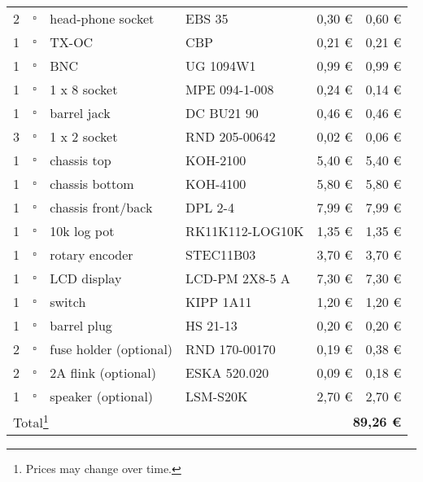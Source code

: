 \begin{longtable}{|p{}|p{}|p{}|p{}|p{}|p{}|}
2 & $\square$ & head-phone socket & EBS 35 & 0,30 \euro & 0,60 \euro\\
1 & $\square$ & TX-OC & CBP & 0,21 \euro & 0,21 \euro \\
1 & $\square$ & BNC & UG 1094W1 & 0,99 \euro & 0,99 \euro \\
1 & $\square$ & 1 x 8 socket & MPE 094-1-008 & 0,24 \euro & 0,14 \euro \\
1 & $\square$ & barrel jack & DC BU21 90 & 0,46 \euro & 0,46 \euro \\
3 & $\square$ & 1 x 2 socket & RND 205-00642 & 0,02 \euro & 0,06 \euro \\ \hline
1 & $\square$ & chassis top & KOH-2100 & 5,40 \euro & 5,40 \euro \\
1 & $\square$ & chassis bottom & KOH-4100 & 5,80 \euro & 5,80 \euro \\
1 & $\square$ & chassis front/back & DPL 2-4 & 7,99 \euro & 7,99 \euro \\
1 & $\square$ & 10k log pot & RK11K112-LOG10K & 1,35 \euro & 1,35 \euro \\
1 & $\square$ & rotary encoder & STEC11B03 & 3,70 \euro & 3,70 \euro \\
1 & $\square$ & LCD display & LCD-PM 2X8-5 A & 7,30 \euro & 7,30 \euro \\
1 & $\square$ & switch & KIPP 1A11 & 1,20 \euro & 1,20 \euro \\
1 & $\square$ & barrel plug & HS 21-13 & 0,20 \euro & 0,20 \euro \\
2 & $\square$ & fuse holder (optional) & RND 170-00170 & 0,19 \euro & 0,38 \euro \\
2 & $\square$ & 2A flink (optional) & ESKA 520.020 & 0,09 \euro & 0,18 \euro \\
1 & $\square$ & speaker (optional) & LSM-S20K & 2,70 \euro & 2,70 \euro \\ \hline \hline
\multicolumn{4}{|l}{Total\footnote{Prices may change over time.}} & \multicolumn{2}{r|}{\textbf{89,26 \euro}} \\ \hline
\end{longtable}
